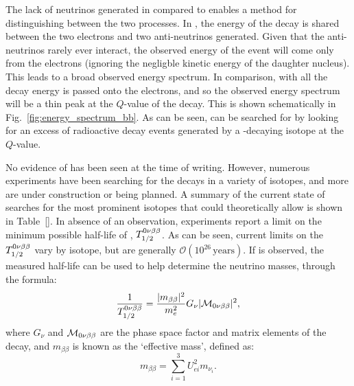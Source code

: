 The lack of neutrinos generated in \onbb{} compared to \twonbb{} enables a method for distinguishing between the two processes. In \twonbb{}, the energy of the decay is shared between the two electrons and two anti-neutrinos generated. Given that the anti-neutrinos rarely ever interact, the observed energy of the event will come only from the electrons (ignoring the negligble kinetic energy of the daughter nucleus). This leads to a broad observed energy spectrum. In comparison, with \onbb{} all the decay energy is passed onto the electrons, and so the observed energy spectrum will be a thin peak at the $Q$-value of the decay. This is shown schematically in Fig.~\ref{fig:energy_spectrum_bb}. As can be seen, \onbb{} can be searched for by looking for an excess of radioactive decay events generated by a \twonbb{}-decaying isotope at the $Q$-value.

No evidence of \onbb{} has been seen at the time of writing. However, numerous experiments have been searching for the decays in a variety of isotopes, and more are under construction or being planned. A summary of the current state of searches for the most prominent isotopes that could theoretically allow \onbb{} is shown in Table~\ref{}. In absence of an observation, experiments report a limit on the minimum possible half-life of \onbb{}, $T_{1/2}^{0\nu\beta\beta{}}$. As can be seen, current limits on the $T_{1/2}^{0\nu\beta\beta{}}$ vary by isotope, but are generally $\mathcal{O}(10^{26}\,\mathrm{ years})$. If \onbb{} is observed, the measured half-life can be used to help determine the neutrino masses, through the formula:
\begin{equation}
    \frac{1}{T_{1/2}^{0\nu\beta\beta{}}} = \frac{ |m_{\beta\beta}|^{2}}{m_{e}^{2}}G_{\nu}|\mathcal{M}_{0\nu\beta\beta{}}|^{2},
\end{equation}
where $G_{\nu}$ and $\mathcal{M}_{0\nu\beta\beta{}}$ are the phase space factor and matrix elements of the decay, and $m_{\beta\beta}$ is known as the `effective \onbb{} mass', defined as:
\begin{equation}
    m_{\beta\beta} = \sum_{i=1}^{3}U_{ei}^2m_{\nu_{i}}.
\end{equation}

